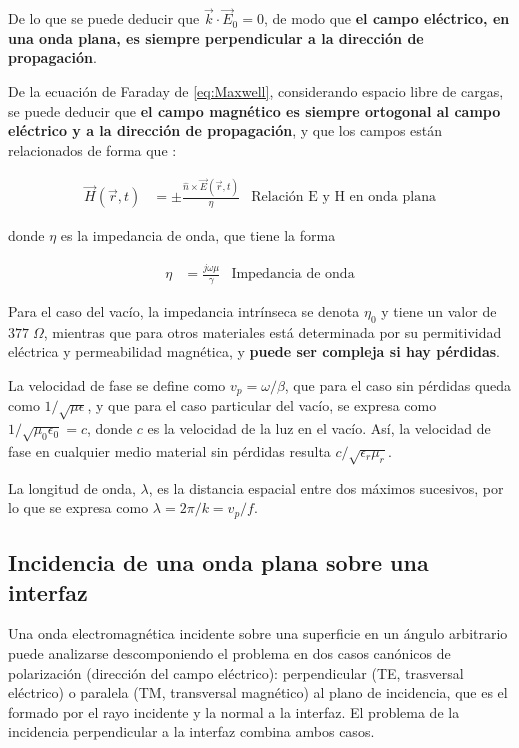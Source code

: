De lo que se puede deducir que $\vec{k} \cdot \vec{E}_0 = 0$, de modo que \textbf{el campo eléctrico, en una onda plana, es siempre perpendicular a la dirección de propagación}.

De la ecuación de Faraday de \ref{eq:Maxwell}, considerando espacio libre de cargas, se puede deducir que \textbf{el campo magnético es siempre ortogonal al campo eléctrico y a la dirección de propagación}, y que los campos están relacionados de forma que \cite{Fernandez:Electromag}:

\begin{align}
	\label{eq:relacion-e-h-ondaplana}
	\vec{H}(\vec{r},t) &= \pm \frac{\hat{n} \times \vec{E}(\vec{r},t)}{\eta}  & \text{Relación E y H en onda plana}
\end{align}

donde $\eta$ es la impedancia de onda, que tiene la forma

\begin{align}
	\eta &= \frac{j \omega \mu}{\gamma }& \text{Impedancia de onda}
\end{align}

Para el caso del vacío, la impedancia intrínseca se denota $\eta_0$ y tiene un valor de $377\; \Omega$, mientras que para otros materiales está determinada por su permitividad eléctrica y permeabilidad magnética, y \textbf{puede ser compleja si hay pérdidas}.

La velocidad de fase se define como $v_p=\omega/\beta$, que para el caso sin pérdidas queda como $1/\sqrt{\mu \epsilon}$, y que para el caso particular del vacío, se expresa como $1/\sqrt{\mu_0 \epsilon_0} = c$, donde $c$ es la velocidad de la luz en el vacío. Así, la velocidad de fase en cualquier medio material sin pérdidas resulta $c/\sqrt{\epsilon_r \mu_r}$.

La longitud de onda, $\lambda$, es la distancia espacial entre dos máximos sucesivos, por lo que se expresa como $\lambda = 2\pi / k = v_p/f$.

\subsection{Incidencia de una onda plana sobre una interfaz}

Una onda electromagnética incidente sobre una superficie en un ángulo arbitrario puede analizarse descomponiendo el problema en dos casos canónicos de polarización (dirección del campo eléctrico): perpendicular (TE, trasversal eléctrico) o paralela (TM, transversal magnético) al plano de incidencia, que es el formado por el rayo incidente y la normal a la interfaz. El problema de la incidencia perpendicular a la interfaz combina ambos casos.

